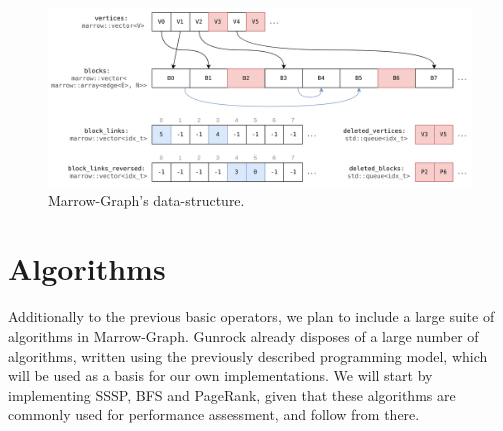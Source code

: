 
\begin{figure}
  \centering
    \includegraphics[width=\textwidth]{Chapters/Figures/Images/marrow_graph_data_struct.png}
    \caption{Marrow-Graph's data-structure.}
\label{fig:mg2_data_struct}
\end{figure}


\section{Algorithms}

Additionally to the previous basic operators, we plan to include a large suite of algorithms in Marrow-Graph. Gunrock already disposes of a large number of algorithms, written using the previously described programming model, which will be used as a basis for our own implementations. We will start by implementing \gls{SSSP}, \gls{BFS} and PageRank, given that these algorithms are commonly used for performance assessment, and follow from there.
